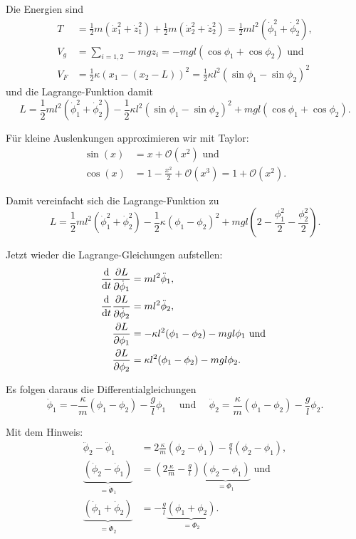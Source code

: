 Die Energien sind
\begin{align*}
	T &= \frac{1}{2} m \left( \dot{x}_1^2 + \dot{z}_1^2 \right)
	+ \frac{1}{2} m \left( \dot{x}_2^2 + \dot{z}_2^2 \right)	
	= \frac{1}{2} m l^2 \left( \dot{\phi}_1^2 + \dot{\phi}_2^2 \right), \\
	V_g &= \sum_{i = 1, 2} - m g z_i = - m g l (\cos \phi_1 + \cos \phi_2) \text{ und } \\
	V_F &= \frac{1}{2} \kappa (x_1 - (x_2 - L))^2 = \frac{1}{2} \kappa l^2 (\sin \phi_1 - \sin \phi_2)^2
\end{align*}
und die Lagrange-Funktion damit
\[
	L = \frac{1}{2} m l^2 (\dot{\phi}_1^2 + \dot{\phi}_2^2)
	- \frac{1}{2} \kappa l^2 (\sin \phi_1 - \sin \phi_2)^2
	+ m g l (\cos \phi_1 + \cos \phi_2)
	\text{.}
\]

Für kleine Auslenkungen approximieren wir mit Taylor:
\begin{align*}
	\sin(x) &= x + \mathcal{O}(x^2) \text{ und } \\
	\cos(x) &= 1 - \frac{x^2}{2} + \mathcal{O}(x^3) = 1 + \mathcal{O}(x^2)
	\text{.}
\end{align*}

Damit vereinfacht sich die Lagrange-Funktion zu
\[
	L = \frac{1}{2} m l^2 (\dot{\phi}_1^2 + \dot{\phi}_2^2)
	- \frac{1}{2} \kappa (\phi_1 - \phi_2)^2
	+ m g l \left( 2 - \frac{\phi_1^2}{2} - \frac{\phi_2^2}{2} \right)
	\text{.}
\]

Jetzt wieder die Lagrange-Gleichungen aufstellen:
\begin{align*}
	\frac{\mathrm{d}}{\mathrm{d}t} \frac{\partial L}{\partial \dot{\phi}_1} &= m l^2 \ddot{\phi}_1, \\
	\frac{\mathrm{d}}{\mathrm{d}t} \frac{\partial L}{\partial \dot{\phi}_2} &= m l^2 \ddot{\phi}_2, \\
	\frac{\partial L}{\partial \phi_1} &= - \kappa l^2 (\phi_1 - \phi_2) - m g l \phi_1 \text{ und } \\
	\frac{\partial L}{\partial \phi_2} &= \kappa l^2 (\phi_1 - \phi_2) - m g l \phi_2
	\text{.}
\end{align*}

Es folgen daraus die Differentialgleichungen
\[
	\ddot{\phi}_1 = - \frac{\kappa}{m} (\phi_1 - \phi_2) - \frac{g}{l} \phi_1
	\quad \text{ und } \quad 
	\ddot{\phi}_2 = \frac{\kappa}{m} (\phi_1 - \phi_2) - \frac{g}{l} \phi_2
	\text{.}
\]

Mit dem Hinweis:
\begin{align*}
	\ddot{\phi}_2 - \ddot{\phi}_1 &= 2 \frac{\kappa}{m} (\phi_2 - \phi_1) - \frac{g}{l} (\phi_2 - \phi_1), \\
	\underbrace{(\dot{\phi}_2 - \dot{\phi}_1)}_{= \dot{\Phi}_1} &= \left( 2 \frac{\kappa}{m} - \frac{g}{l} \right) \underbrace{\left( \phi_2 - \phi_1 \right)}_{= \Phi_1} \text{ und } \\
	\underbrace{(\dot{\phi}_1 + \dot{\phi}_2)}_{= \dot{\Phi}_2} &= - \frac{g}{l} \underbrace{(\phi_1 + \phi_2)}_{= \Phi_2} \text{.}
\end{align*}


